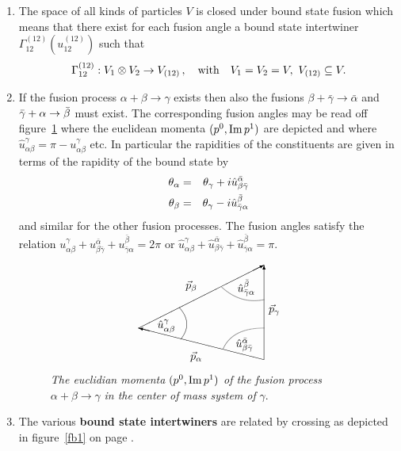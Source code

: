 \documentclass[a4paper,a4paper]{article}
\begin{document}
\begin{enumerate}
\item  The space of all kinds of particles $V$ is closed under bound state
fusion which means that there exist for each fusion angle a bound state
intertwiner $\Gamma _{12}^{(12)}(u_{12}^{(12)})$ such that 
\[
\Gamma _{12}^{(12)}:V_{1}\otimes V_{2}\rightarrow V_{(12)}\,,\quad \mathrm{%
with}\quad V_{1}=V_{2}=V,\ V_{(12)}\subseteq V. 
\]

\item  If the fusion process $\alpha +\beta \rightarrow \gamma $ exists then
also the fusions $\beta +\bar{\gamma}\rightarrow \bar{\alpha}$ and $\bar{%
\gamma}+\alpha \rightarrow \bar{\beta}$ must exist. The corresponding fusion
angles may be read off figure~\ref{fb3} where the euclidean momenta $(p^{0},%
\mathop{\rm Im}p^{1})$ are depicted and where $\hat{u}_{\alpha \beta
}^{\gamma }=\pi -u_{\alpha \beta }^{\gamma }$ etc. In particular the
rapidities of the constituents are given in terms of the rapidity of the
bound state by 
\begin{eqnarray}
\theta _{\alpha } &=&\theta _{\gamma }+i\hat{u}_{\beta \bar{\gamma}}^{\bar{%
\alpha}}  \nonumber \\
\theta _{\beta } &=&\theta _{\gamma }-i\hat{u}_{\bar{\gamma}\alpha }^{\bar{%
\beta}}  \label{b1.38}
\end{eqnarray}
and similar for the other fusion processes. The fusion angles satisfy the
relation $u_{\alpha \beta }^{\gamma }+u_{\beta \bar{\gamma}}^{\bar{\alpha}%
}+u_{\bar{\gamma}\alpha }^{\bar{\beta}}=2\pi $ or $\hat{u}_{\alpha \beta
}^{\gamma }+\hat{u}_{\beta \bar{\gamma}}^{\bar{\alpha}}+\hat{u}_{\bar{\gamma}%
\alpha }^{\bar{\beta}}=\pi $. 
\begin{figure}[tbh]
\[
\unitlength5mm%
\begin{picture}(9,6)
\put(8,0){\vector(0,1){6}}
\put(8,0){\vector(-4,1){8}}
\put(0,2){\vector(2,1){8}}
\put(3.3,0){$\vec p_\alpha$}
\put(3,4.5){$\vec p_\beta$}
\put(8.3,3){$\vec p_\gamma$}
\bezier{80}(2.7,1.3)(3.5,2.3)(2.6,3.3)
\put(1.2,2){$\hat u_{\alpha\beta}^{\gamma}$}
\bezier{80}(5.4,.7)(6,2)(8,2)
\put(6.2,.8){$\hat u_{\beta\bar\gamma}^{\bar\alpha}$}
\bezier{80}(5.3,4.6)(6.5,3.5)(8,3.8)
\put(6.3,4.3){$\hat u_{\bar\gamma\alpha}^{\bar\beta}$}
\end{picture}
\]
\caption{\textit{The euclidian momenta }$(p^{0},\mathop{\rm Im}p^{1})$ 
\textit{of the fusion process }$\alpha +\beta \rightarrow \gamma $ \textit{%
in the center of mass system of }$\gamma $.}
\label{fb3}
\end{figure}

\item  The various \textbf{bound state intertwiners} are related by crossing
as depicted in figure~\ref{fb1} on page \pageref{fb1}.
\end{enumerate}
\end{document}
